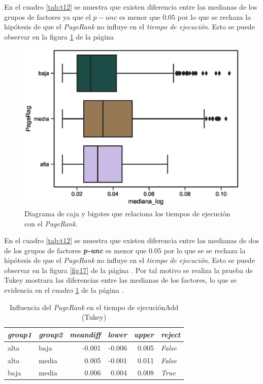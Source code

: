 \documentclass{article}
\begin{document}
En el cuadro \ref{tab:t12} se muestra que existen diferencia entre las medianas de los grupos de factores ya que el \emph{$p-unc$} es menor que $0.05$ por lo que se rechaza la hipótesis de que el \textit{PageRank} no influye en el \textit{tiempo de ejecución}. Esto se puede observar en la figura \ref{fig18} de la página \pageref{fig18}

\begin{center}
\begin{figure}[htbp]
\includegraphics[scale=0.6]{boxplot_PageRag.eps}
\caption{Diagrama de caja y bigotes que relaciona los tiempos de ejecución con el \textit{PageRank}.}
\label{fig18}
\end{figure}
\end{center}


En el cuadro \ref{tab:t12} se muestra que existen  diferencia entre las medianas de dos de los grupos de factores  \textbf{\emph{p-unc}} es menor que $0.05$ por lo que se se rechaza la hipótesis de que el \textit{PageRank} no influye en el \textit{tiempo de ejecución}. Esto se puede observar en la figura \ref{fig17} de la página \pageref{fig17}. Por tal motivo se realiza la prueba de Tukey mostrara las diferencias entre las medianas de los factores, lo que se evidencia en el cuadro \ref{tab:t19} de la página \pageref{tab:t19}.

\begin{table}[htbp]
  \centering
  \caption{Influencia del \textit{PageRank} en el tiempo de ejecuciónAdd (Tukey)}
    \begin{tabular}{llrrrl}
    \toprule
    \textit{\textbf{group1}} & \textit{\textbf{group2}} & \multicolumn{1}{l}{\textit{\textbf{meandiff}}} & \multicolumn{1}{l}{\textit{\textbf{lower}}} & \multicolumn{1}{l}{\textit{\textbf{upper}}} & \textit{\textbf{reject}} \\
    \midrule
    alta  & baja  & -0.001 & -0.006 & 0.005 & \textit{False} \\
    alta  & media & 0.005 & -0.001 & 0.011 & \textit{False} \\
    baja  & media & 0.006 & 0.004 & 0.008 & \textit{True} \\
    \bottomrule
    \end{tabular}%
  \label{tab:t19}%
\end{table}%
\end{document}
